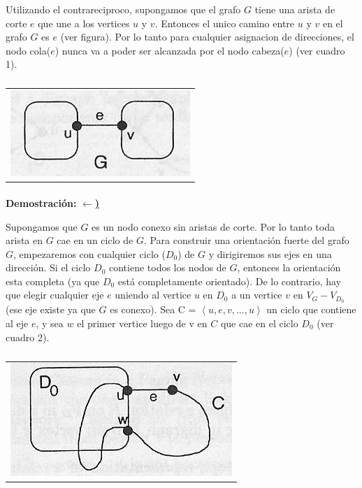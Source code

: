Utilizando el contrareciproco, supongamos que el grafo $G$ tiene una arista de corte $e$ que une a los vertices $u$ y $v$. Entonces el unico camino entre $u$ y $v$ en el grafo $G$ es $e$ (ver figura). Por lo tanto para cualquier asignacion de direcciones, el nodo cola($e$) nunca va a poder ser alcanzada por el nodo cabeza($e$) (ver cuadro 1).

	\begin{table}[h!] %
		\centering %
			\begin{tabular}{c}
				\includegraphics[scale=0.7]{./figura1.jpg} 

				\end{tabular}
				\caption{} %
				\label{} %
	\end{table}

\paragraph{} 
\textbf{Demostración:} \underline{\textbf{$\leftarrow$)}}

Supongamos que $G$ es un nodo conexo sin aristas de corte. Por lo tanto toda arista en $G$ cae en un ciclo de $G$.
Para construir una orientación fuerte del grafo $G$, empezaremos con cualquier ciclo ($D_0$) de $G$ y dirigiremos sus ejes en una dirección. Si el ciclo $D_0$ contiene todos los nodos de $G$, entonces la orientación esta completa (ya que $D_0$ está completamente orientado). De lo contrario, hay que elegir cualquier eje $e$ uniendo al vertice $u$ en $D_0$ a un vertice $v$ en $V_G - V_{D_0}$ (ese eje existe ya que $G$ es conexo). Sea C = $\left\langle u,e,v,...,u  \right\rangle$ un ciclo que contiene al eje $e$, y sea $w$ el primer vertice luego de v en $C$ que cae en el ciclo $D_0$ (ver cuadro 2).

	\begin{table}[h!] %
		\centering %
			\begin{tabular}{c}
				\includegraphics[scale=0.7]{./figura2.jpg} 

				\end{tabular}
				\caption{} %
				\label{} %
	\end{table}

